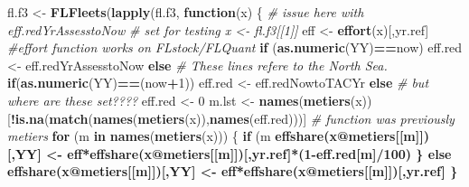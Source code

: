 \documentclass[
]{article}
\newenvironment{Shaded}{\begin{snugshade}}{\end{snugshade}}
\newcommand{\CommentTok}[1]{\textcolor[rgb]{0.56,0.35,0.01}{\textit{#1}}}
\newcommand{\ControlFlowTok}[1]{\textcolor[rgb]{0.13,0.29,0.53}{\textbf{#1}}}
\newcommand{\DecValTok}[1]{\textcolor[rgb]{0.00,0.00,0.81}{#1}}
\newcommand{\KeywordTok}[1]{\textcolor[rgb]{0.13,0.29,0.53}{\textbf{#1}}}
\newcommand{\NormalTok}[1]{#1}
\newcommand{\OperatorTok}[1]{\textcolor[rgb]{0.81,0.36,0.00}{\textbf{#1}}}
\newcommand{\StringTok}[1]{\textcolor[rgb]{0.31,0.60,0.02}{#1}}
\begin{document}
\begin{Shaded}
\begin{Highlighting}[]
\NormalTok{                          fl.f3 <-}\StringTok{ }\KeywordTok{FLFleets}\NormalTok{(}\KeywordTok{lapply}\NormalTok{(fl.f3, }\ControlFlowTok{function}\NormalTok{(x) \{  }\CommentTok{# issue here with eff.redYrAssesstoNow}
                            \CommentTok{# set for testing x <- fl.f3[[1]]}
\NormalTok{                                      eff <-}\StringTok{ }\KeywordTok{effort}\NormalTok{(x)[,yr.ref]   }\CommentTok{#effort function works on FLstock/FLQuant}
                                      \ControlFlowTok{if}\NormalTok{ (}\KeywordTok{as.numeric}\NormalTok{(YY)}\OperatorTok{==}\NormalTok{now) eff.red <-}\StringTok{ }\NormalTok{eff.redYrAssesstoNow }\ControlFlowTok{else} \CommentTok{# These lines refere to the North Sea.}
                                         \ControlFlowTok{if}\NormalTok{(}\KeywordTok{as.numeric}\NormalTok{(YY)}\OperatorTok{==}\NormalTok{(now}\OperatorTok{+}\DecValTok{1}\NormalTok{)) eff.red <-}\StringTok{ }\NormalTok{eff.redNowtoTACYr }\ControlFlowTok{else} \CommentTok{# but where are these set????}
\NormalTok{                                            eff.red <-}\StringTok{ }\DecValTok{0}
\NormalTok{                                                m.lst <-}\StringTok{ }\KeywordTok{names}\NormalTok{(}\KeywordTok{metiers}\NormalTok{(x))[}\OperatorTok{!}\KeywordTok{is.na}\NormalTok{(}\KeywordTok{match}\NormalTok{(}\KeywordTok{names}\NormalTok{(}\KeywordTok{metiers}\NormalTok{(x)),}\KeywordTok{names}\NormalTok{(eff.red)))]}
                                                \CommentTok{# function was previously metiers}
                                                \ControlFlowTok{for}\NormalTok{ (m }\ControlFlowTok{in} \KeywordTok{names}\NormalTok{(}\KeywordTok{metiers}\NormalTok{(x))) \{}
                                                    \ControlFlowTok{if}\NormalTok{ (m }\OperatorTok{%in%}\StringTok{ }\NormalTok{m.lst) \{}
                                                        \KeywordTok{effshare}\NormalTok{(x}\OperatorTok{@}\NormalTok{metiers[[m]])[,YY] <-}\StringTok{ }\NormalTok{eff}\OperatorTok{*}\KeywordTok{effshare}\NormalTok{(x}\OperatorTok{@}\NormalTok{metiers[[m]])[,yr.ref]}\OperatorTok{*}\NormalTok{(}\DecValTok{1}\OperatorTok{-}\NormalTok{eff.red[m]}\OperatorTok{/}\DecValTok{100}\NormalTok{)}
\NormalTok{                                                    \} }\ControlFlowTok{else} \KeywordTok{effshare}\NormalTok{(x}\OperatorTok{@}\NormalTok{metiers[[m]])[,YY] <-}\StringTok{ }\NormalTok{eff}\OperatorTok{*}\KeywordTok{effshare}\NormalTok{(x}\OperatorTok{@}\NormalTok{metiers[[m]])[,yr.ref]}
\NormalTok{                                                \}}
}
\end{Highlighting}
\end{Shaded}
\end{document}
